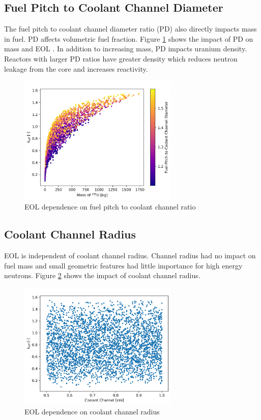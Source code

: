 \subsection{Fuel Pitch to Coolant Channel Diameter}
The fuel pitch to coolant channel diameter ratio (PD) also directly impacts
\uran mass in fuel. PD affects volumetric fuel fraction. Figure
\ref{fig:eol_keff_vs_PD_mass} shows the impact of PD on \uran mass and EOL
\keff. In addition to increasing \uran mass, PD impacts uranium density.
Reactors with larger PD ratios have greater \uran density which reduces neutron
leakage from the core and increases reactivity.

\begin{figure}[h]
    \centering
    \includegraphics[width=3in]{../images/keff_vs_mass_235_PD.png}
\caption{EOL \keff dependence on fuel pitch to coolant channel ratio}
\label{fig:eol_keff_vs_PD_mass}
\end{figure}


\subsection{Coolant Channel Radius}
EOL \keff is independent of coolant channel radius. Channel radius had no impact
on fuel mass and small geometric features
had little importance for high energy neutrons. Figure
\ref{fig:eol_keff_vs_r_cool} shows the impact of coolant channel radius.

\begin{figure}[h]
    \centering
    \includegraphics[width=3in]{../images/keff_vs_cool_r.png}
\caption{EOL \keff dependence on coolant channel radius}
\label{fig:eol_keff_vs_r_cool}
\end{figure}


